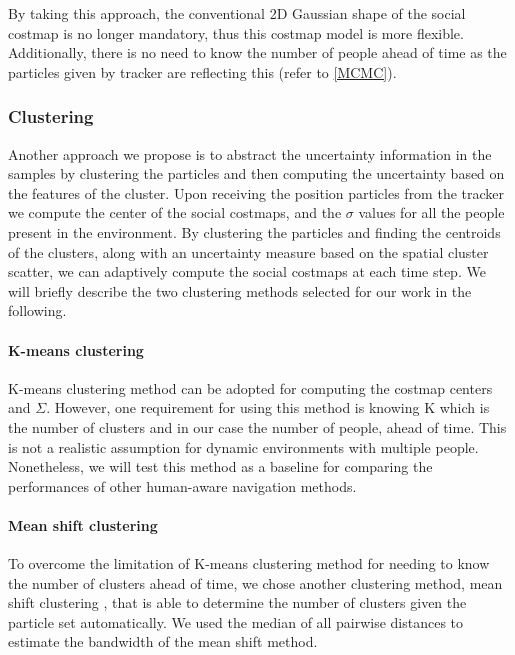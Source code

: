    
By taking this approach, the conventional 2D Gaussian shape of the social costmap is no longer mandatory, thus this costmap model is more flexible. Additionally, there is no need to know the number of people ahead of time as the particles given by tracker are reflecting this (refer to \ref{MCMC}).%


\subsubsection*{\normalfont \textbf{Clustering}}
Another approach we propose is to abstract the uncertainty information in the samples by clustering the particles and then computing the uncertainty based on the features of the cluster. Upon receiving the position particles from the tracker we compute the center of the social costmaps, and the ${\sigma}$ values for all the people present in the environment. By clustering the particles and finding the centroids of the clusters, along with an uncertainty measure based on the spatial cluster scatter, we can adaptively compute the social costmaps at each time step. We will briefly describe the two clustering methods selected for our work in the following.
\paragraph{K-means clustering}

K-means clustering \cite{hartigan1979algorithm} method can be adopted for computing the costmap centers and $\Sigma$. However, one requirement for using this method is knowing K which is the number of clusters and in our case the number of people, ahead of time. This is not a realistic assumption for dynamic environments with multiple people. Nonetheless, we will test this method as a baseline for comparing the performances of other human-aware navigation methods.%

\paragraph{Mean shift clustering}
To overcome the limitation of K-means clustering method for needing to know the number of clusters ahead of time, we chose another clustering method, mean shift clustering \cite{comaniciu2002mean}, that is able to determine the number of clusters given the particle set automatically. We used the median of all pairwise distances to estimate the bandwidth of the mean shift method.


